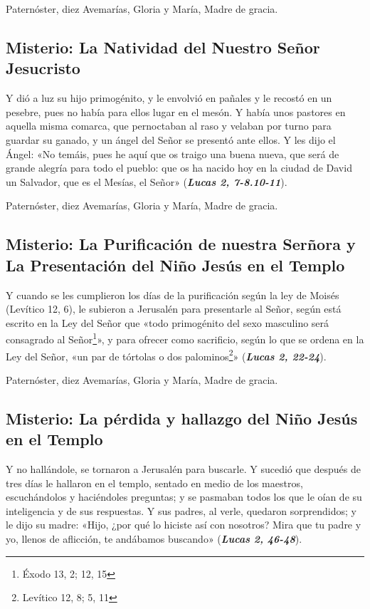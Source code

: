 \documentclass[./main.tex]{subfiles}
\newcounter{joyful-counter}
\begin{document}
\begin{center}
      Paternóster, diez Avemarías, Gloria y María, Madre de gracia.
\end{center}

\subsection*{ Misterio: La Natividad del Nuestro Señor Jesucristo}
Y dió a luz su hijo primogénito, y le envolvió en pañales y le recostó en un pesebre, pues no había para ellos lugar en el mesón.
Y había unos pastores en aquella misma comarca, que pernoctaban al raso y velaban por turno para guardar su ganado,
y un ángel del Señor se presentó ante ellos. Y les dijo el Ángel: «No temáis, pues he aquí que os traigo una buena nueva,
que será de grande alegría para todo el pueblo: que os ha nacido hoy en la ciudad de David un Salvador, que es el Mesías, el Señor» (\textbf{\emph{Lucas 2, 7-8.10-11}}).

\begin{center}
      Paternóster, diez Avemarías, Gloria y María, Madre de gracia.
\end{center}

\subsection*{ Misterio: La Purificación de nuestra Serñora y La Presentación del Niño Jesús en el Templo}
Y cuando se les cumplieron los días de la purificación según la ley de Moisés (Levítico 12, 6),
le subieron a Jerusalén para presentarle al Señor, según está escrito en la Ley del Señor que «todo primogénito
del sexo masculino será consagrado al Señor\footnote{Éxodo 13, 2; 12, 15}», y para ofrecer como sacrificio,
según lo que se ordena en la Ley del Señor, «un par de tórtolas o dos palominos\footnote{Levítico 12, 8; 5, 11}» (\textbf{\emph{Lucas 2, 22-24}}).

\begin{center}
      Paternóster, diez Avemarías, Gloria y María, Madre de gracia.
\end{center}

\subsection*{ Misterio: La pérdida y hallazgo del Niño Jesús en el Templo}
Y no hallándole, se tornaron a Jerusalén para buscarle. Y sucedió que después de tres días le hallaron en el templo,
sentado en medio de los maestros, escuchándolos y haciéndoles preguntas; y se pasmaban todos los que le oían de su
inteligencia y de sus respuestas. Y sus padres, al verle, quedaron sorprendidos; y le dijo su madre:
«Hijo, ¿por qué lo hiciste así con nosotros? Mira que tu padre y yo, llenos de aflicción, te andábamos buscando» (\textbf{\emph{Lucas 2, 46-48}}).
\end{document}
